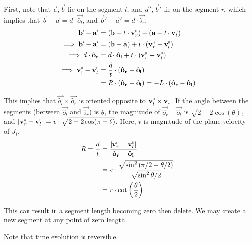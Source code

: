 First, note that $\vec a, \vec b$ lie on the segment $l$, and $\vec a', \vec b'$ lie on the segment $r$,
which implies that $\vec b-\vec a = d\cdot \vec{\hat o_l}$, and $\vec b'-\vec a' = d\cdot \vec{\hat o_r}$.
\begin{align}
\vec b' - \vec a' &= (\vec b + t\cdot \vec v_r^\shortparallel) - (\vec a + t\cdot \vec v_l^\shortparallel)\\
\implies \vec b' - \vec a' &= (\vec b - \vec a) + t\cdot(\vec v_r^\shortparallel - \vec v_l^\shortparallel)\\
\implies d\cdot \vec{\hat o_r} &= d\cdot \vec{\hat o_l} + t\cdot(\vec v_r^\shortparallel - \vec v_l^\shortparallel)\\
\implies \vec v_r^\shortparallel - \vec v_l^\shortparallel &= \frac{d}{t}\cdot(\vec{\hat o_r}-\vec{\hat o_l})\\
&= R\cdot(\vec{\hat o_r}-\vec{\hat o_l}) = -L\cdot(\vec{\hat o_r}-\vec{\hat o_l})
\end{align}

This implies that $\vec{\hat o_l}\times \vec{\hat o_r}$ is oriented opposite to $\vec v_l^\shortparallel\times \vec v_r^\shortparallel$.
If the angle between the segments (between $\vec{\hat o_l}$ and $\vec{\hat o_r}$) is $\theta$,
the magnitude of $\vec{\hat o_r}-\vec{\hat o_l}$ is $\sqrt{2-2\cos(\theta)}$,
and $|\vec v_r^\shortparallel-\vec v_l^\shortparallel| = v\cdot\sqrt{2-2\cos(\pi-\theta)}$.
Here, $v$ is magnitude of the plane velocity of $J_i$.
\begin{align}
R = \frac dt &= \frac{|\vec v_r^\shortparallel - \vec v_l^\shortparallel|}{|\vec{\hat o_r}-\vec{\hat o_l}|}\\
&= v\cdot\frac{\sqrt{\sin^2\left( {\pi/2-\theta/2}\right)}}{\sqrt{\sin^2{\theta/2}}}\\
&= v\cdot\cot\left( \frac{\theta}{2} \right)
\end{align}


This can result in a segment length becoming zero then delete.
We may create a new segment at any point of zero length.

Note that time evolution is reversible.

